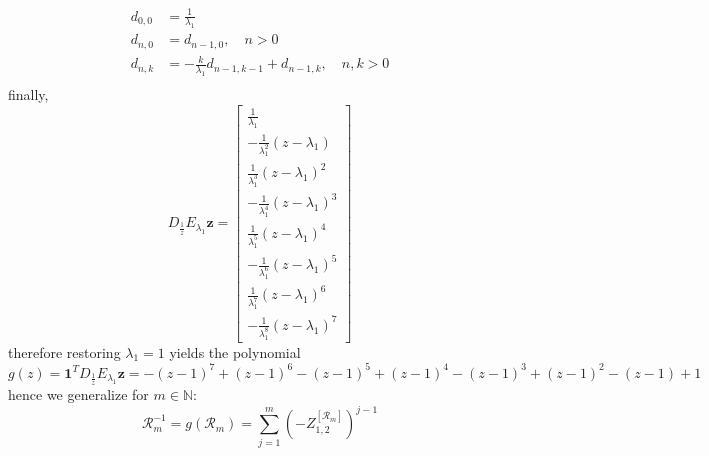 \begin{displaymath}
\begin{split}
d_{0,0}&=\frac{1}{\lambda_{1}}\\
d_{n,0}&=d_{n-1, 0}, \quad n>0 \\
d_{n,k}&=-\frac{k}{\lambda_{1}}d_{n-1, k-1} + d_{n-1,k}, \quad n,k > 0\\
\end{split}
\end{displaymath}
finally,
\begin{displaymath}
D_{\frac{1}{z}}E_{\lambda_{1}}\boldsymbol{z} = \left[\begin{matrix}\frac{1}{\lambda_{1}}\\- \frac{1}{\lambda_{1}^{2}} \left(z - \lambda_{1}\right)\\\frac{1}{\lambda_{1}^{3}} \left(z - \lambda_{1}\right)^{2}\\- \frac{1}{\lambda_{1}^{4}} \left(z - \lambda_{1}\right)^{3}\\\frac{1}{\lambda_{1}^{5}} \left(z - \lambda_{1}\right)^{4}\\- \frac{1}{\lambda_{1}^{6}} \left(z - \lambda_{1}\right)^{5}\\\frac{1}{\lambda_{1}^{7}} \left(z - \lambda_{1}\right)^{6}\\- \frac{1}{\lambda_{1}^{8}} \left(z - \lambda_{1}\right)^{7}\end{matrix}\right]
\end{displaymath}
therefore restoring $\lambda_{1}=1$ yields the polynomial
\[g{\left (z \right )} = \boldsymbol{1}^{T}D_{\frac{1}{z}}E_{\lambda_{1}}\boldsymbol{z} = - \left(z - 1\right)^{7} + \left(z - 1\right)^{6} - \left(z - 1\right)^{5} + \left(z - 1\right)^{4} - \left(z - 1\right)^{3} + \left(z - 1\right)^{2} - (z-1) + 1\]
hence we generalize for $m\in\mathbb{N}$:
\begin{displaymath}
\mathcal{R}_{m}^{-1} = g{\left (\mathcal{R}_{m} \right )} = \sum_{j=1}^{m}{\left(-Z_{1,2}^{[\mathcal{R}_{m}]}\right)^{j-1}}
\end{displaymath}


